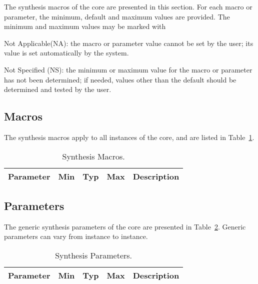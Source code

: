 \ifdefined\SMP

\ifdefined\SM

The synthesis macros of the core are presented in this section. For each macro
or parameter, the minimum, default and maximum values are provided. The minimum
and maximum values may be marked with
\begin{description}
\item{Not Applicable(NA)}:  the macro or parameter value cannot be set by the user; its value is set automatically by the system.
\item{Not Specified (NS)}:  the minimum or maximum value for the macro or parameter has not been determined; if needed, values other than the default should be determined and tested by the user. 
\end{description}

\subsection{Macros}
\label{sec:macr}

The synthesis macros apply to all instances of the core, and are listed in
Table~\ref{tab:sm}.

\begin{table}[h]
  \centering
    \begin{tabularx}{\textwidth}{ | c | c | c | c | X | }
    \hline
    \rowcolor{iob-green}
    {\bf Parameter} & {\bf Min} & {\bf Typ} & {\bf Max} & {\bf Description} \\\hline

    

    \end{tabularx}
  \caption{Synthesis Macros.}
  \label{tab:sm}
\end{table}

\fi

\ifdefined\SP

\subsection{Parameters}
\label{sec:param}

The generic synthesis parameters of the core are presented in Table~\ref{tab:sp}. Generic parameters can vary from instance to instance.

\begin{table}[h]
  \centering
    \begin{tabularx}{\textwidth}{ | c | c | c | c | X | }
    \hline
    \rowcolor{iob-green}
    {\bf Parameter} & {\bf Min} & {\bf Typ} & {\bf Max} & {\bf Description} \\\hline

    

    \end{tabularx}
  \caption{Synthesis Parameters.}
  \label{tab:sp}
\end{table}

\fi
\fi
